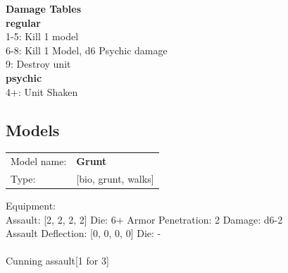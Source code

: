 {\bf Damage Tables} \\
 {\bf regular } \\
1-5: Kill 1 model \\
6-8: Kill 1 Model, d6 Psychic damage \\
9: Destroy unit \\
 {\bf psychic } \\
4+: Unit Shaken \\


\clearpage

\subsection{ Models }

\begin{tabular}{ll}
Model name: & {\bf Grunt } \\
Type: & [bio, grunt, walks] \\
\end{tabular}

Equipment:  \\

Assault: [2, 2, 2, 2] Die: 6+ Armor Penetration: 2 Damage: d6-2 \\
Assault Deflection: [0, 0, 0, 0] Die: -\\
\\ 
Cunning assault[1 for 3]\\ 
 



 















